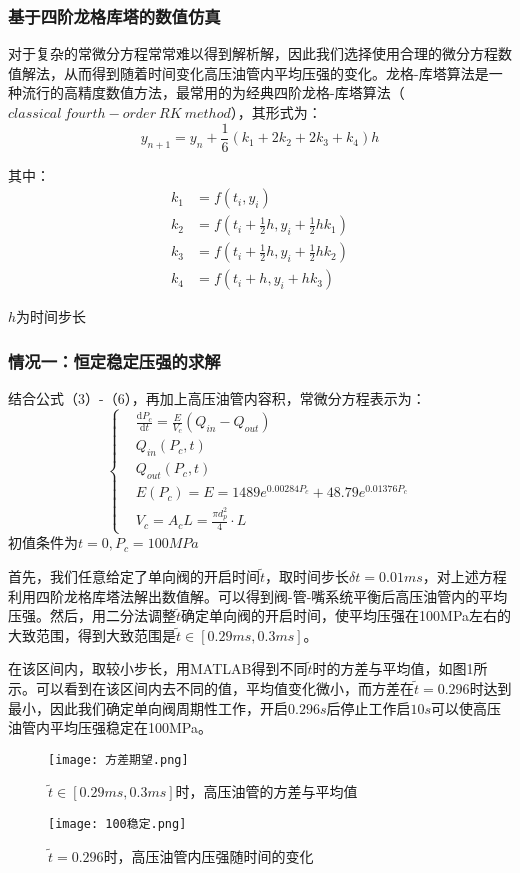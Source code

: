 \documentclass[withoutpreface,bwprint]{cumcmthesis} %
\begin{document}
			\subsubsection{基于四阶龙格库塔的数值仿真}
			对于复杂的常微分方程常常难以得到解析解，因此我们选择使用合理的微分方程数值解法，从而得到随着时间变化高压油管内平均压强的变化。龙格-库塔算法是一种流行的高精度数值方法，最常用的为经典四阶龙格-库塔算法（$classical\ fourth-order\ RK\ method$），其形式为：
			\[
			y_{n+1}=y_{n}+\frac{1}{6}(k_{1}+2k_{2}+2k_{3}+k_{4})h
			\]
			
			其中：
			\begin{align*}
			k_{1}&=f(t_{i},y_{i})\\
			k_{2}&=f(t_{i}+\frac{1}{2}h,y_{i}+\frac{1}{2}hk_{1})\\
			k_{3}&=f(t_{i}+\frac{1}{2}h,y_{i}+\frac{1}{2}hk_{2})\\
			k_{4}&=f(t_{i}+h,y_{i}+hk_{3})
			\end{align*}
			
			$h$为时间步长
			\subsubsection{情况一：恒定稳定压强的求解}
			结合公式（3）-（6），再加上高压油管内容积，常微分方程表示为：
			\begin{equation} \left\{
			\begin{aligned}
			&\frac{\mathrm{d}P_c}{\mathrm{d}t} = \frac{E}{V_c}(Q_{in} - Q_{out}) \\
			&Q_{in} (P_c,t) \\
			&Q_{out} (P_c,t) \\
			&E(P_c) = E = 1489 e^{0.00284P_c} + 48.79 e^{0.01376 P_c} \\
			&V_c = A_cL = \frac{\pi d_p^2}{4} \cdot L
			\end{aligned}
			\right. \end{equation}
			初值条件为$t = 0, P_c = 100MPa$
			
			
			首先，我们任意给定了单向阀的开启时间$\widetilde{t}$，取时间步长$\delta t = 0.01ms$，对上述方程利用四阶龙格库塔法解出数值解。可以得到阀-管-嘴系统平衡后高压油管内的平均压强。然后，用二分法调整$\widetilde{t}$确定单向阀的开启时间，使平均压强在100MPa左右的大致范围，得到大致范围是$\widetilde{t}\in [0.29ms,0.3ms]$。
			
			在该区间内，取较小步长，用MATLAB得到不同$\widetilde{t}$时的方差与平均值，如图1所示。可以看到在该区间内去不同的值，平均值变化微小，而方差在$\widetilde{t}=0.296$时达到最小，因此我们确定单向阀周期性工作，开启$0.296s$后停止工作启$10s$可以使高压油管内平均压强稳定在100MPa。
			\begin{figure}[!htbp]
				\centering
				\texttt{[image: 方差期望.png]}
				\caption{$\widetilde{t}\in [0.29ms,0.3ms]$时，高压油管的方差与平均值}
			\end{figure}
			\begin{figure}[!htbp]
				\centering
				\texttt{[image: 100稳定.png]}
				\caption{$\widetilde{t}=0.296$时，高压油管内压强随时间的变化}
			\end{figure}			
\end{document}
